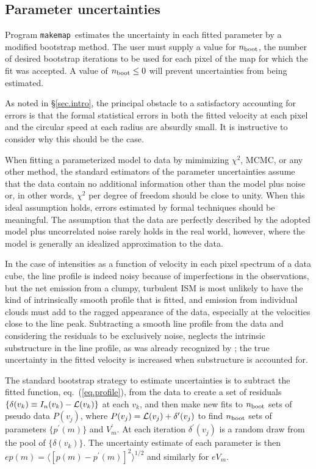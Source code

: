 \documentclass[letterpaper,fleqn,usenatbib]{mnras}
\def\mkm{{\tt makemap}}
\begin{document}
\subsection{Parameter uncertainties}
\label{sec.boots}
Program \mkm\ estimates the uncertainty in each fitted parameter by a
modified bootstrap method.  The user must supply a value for $n_{\rm
  boot}$, the number of desired bootstrap iterations to be used for
each pixel of the map for which the fit was accepted.  A value of
$n_{\rm boot}\leq0$ will prevent uncertainties from being estimated.

As noted in \S\ref{sec.intro}, the principal obstacle to a
satisfactory accounting for errors is that the formal statistical
errors in both the fitted velocity at each pixel and the circular
speed at each radius are absurdly small.  It is instructive to
consider why this should be the case.

When fitting a parameterized model to data by mimimizing $\chi^2$,
MCMC, or any other method, the standard estimators of the parameter
uncertainties assume that the data contain no additional information
other than the model plus noise or, in other words, $\chi^2$ per
degree of freedom should be close to unity.  When this ideal
assumption holds, errors estimated by formal techniques should be
meaningful.  The assumption that the data are perfectly described by
the adopted model plus uncorrelated noise rarely holds in the real
world, however, where the model is generally an idealized
approximation to the data.

In the case of intensities as a function of velocity in each pixel
spectrum of a data cube, the line profile is indeed noisy because of
imperfections in the observations, but the net emission from a clumpy,
turbulent ISM is most unlikely to have the kind of intrinsically
smooth profile that is fitted, and emission from individual clouds
must add to the ragged appearance of the data, especially at the
velocities close to the line peak.  Subtracting a smooth line profile
from the data and considering the residuals to be exclusively noise,
neglects the intrinsic substructure in the line profile, as was
already recognized by \citet{Oh08, Oh19}; the true uncertainty in the
fitted velocity is increased when substructure is accounted for.

The standard bootstrap strategy to estimate uncertainties is to
subtract the fitted function, eq.~(\ref{eq.profile}), from the data to
create a set of residuals $\{\delta(v_k) \equiv I_n(v_k) - {\cal
  L}(v_k)\}$ at each $v_k$, and then make new fits to $n_{\rm boot}$
sets of pseudo data $P(v_j)$, where $P(v_j) = {\cal L}(v_j) +
\delta^\prime(v_j)$ to find $n_{\rm boot}$ sets of parameters
$\{p^\prime(m)\}$ and $V_m^\prime$.  At each iteration
$\delta^\prime(v_j)$ is a random draw from the pool of
$\{\delta(v_k)\}$.  The uncertainty estimate of each parameter is then
$ep(m) = \langle[p(m)-p^\prime(m)]^2\rangle^{1/2}$ and similarly for
$eV_m$.
\end{document}
